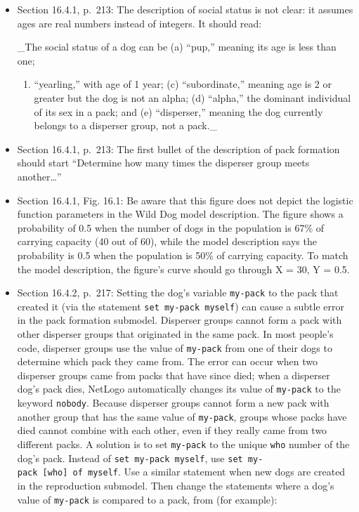 \documentclass[]{article}
\providecommand{\tightlist}{%
  \setlength{\itemsep}{0pt}\setlength{\parskip}{0pt}}
\begin{document}
\begin{itemize}
\item
  Section 16.4.1, p.~213: The description of social status is not clear:
  it assumes ages are real numbers instead of integers. It should read:

  \_The social status of a dog can be (a) ``pup,'' meaning its age is
  less than one;

  \begin{enumerate}
  \def\labelenumi{(\alph{enumi})}
  \setcounter{enumi}{1}
  \tightlist
  \item
    ``yearling,'' with age of 1 year; (c) ``subordinate,'' meaning age
    is 2 or greater but the dog is not an alpha; (d) ``alpha,'' the
    dominant individual of its sex in a pack; and (e) ``disperser,''
    meaning the dog currently belongs to a disperser group, not a
    pack.\_
  \end{enumerate}
\item
  Section 16.4.1, p.~213: The first bullet of the description of pack
  formation should start ``Determine how many times the disperser group
  meets another\ldots{}''
\item
  Section 16.4.1, Fig. 16.1: Be aware that this figure does not depict
  the logistic function parameters in the Wild Dog model description.
  The figure shows a probability of 0.5 when the number of dogs in the
  population is 67\% of carrying capacity (40 out of 60), while the
  model description says the probability is 0.5 when the population is
  50\% of carrying capacity. To match the model description, the
  figure's curve should go through X = 30, Y = 0.5.
\item
  Section 16.4.2, p.~217: Setting the dog's variable \texttt{my-pack} to
  the pack that created it (via the statement
  \texttt{set\ my-pack\ myself}) can cause a subtle error in the pack
  formation submodel. Disperser groups cannot form a pack with other
  disperser groups that originated in the same pack. In most people's
  code, disperser groups use the value of \texttt{my-pack} from one of
  their dogs to determine which pack they came from. The error can occur
  when two disperser groups came from packs that have since died; when a
  disperser dog's pack dies, NetLogo automatically changes its value of
  \texttt{my-pack} to the keyword \texttt{nobody}. Because disperser
  groups cannot form a new pack with another group that has the same
  value of \texttt{my-pack}, groups whose packs have died cannot combine
  with each other, even if they really came from two different packs. A
  solution is to set \texttt{my-pack} to the unique \texttt{who} number
  of the dog's pack. Instead of \texttt{set\ my-pack\ myself}, use
  \texttt{set\ my-pack\ {[}who{]}\ of\ myself}. Use a similar statement
  when new dogs are created in the reproduction submodel. Then change
  the statements where a dog's value of \texttt{my-pack} is compared to
  a pack, from (for example):


\end{itemize}
\end{document}
